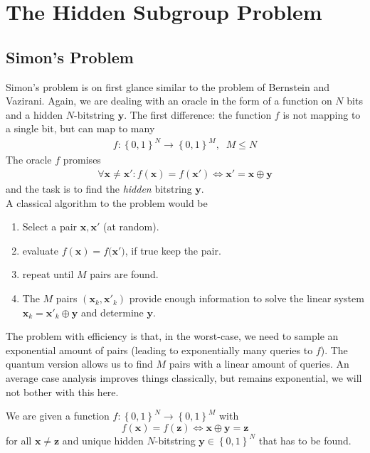 \section{The Hidden Subgroup Problem}

\subsection{Simon's Problem}
Simon's problem is on first glance similar to the problem of Bernstein and Vazirani. Again, we are dealing with an oracle in the form of a function on $N$ bits and a hidden $N$-bitstring $\mathbf{y}$. 
The first difference: the function $f$ is not mapping to a single bit, but can map to many
\begin{align}
    f: \left\{0,1\right\}^N \rightarrow \left\{0,1\right\}^M,\;\; M\leq N
\end{align}
The oracle $f$ promises
\begin{align}
    \forall \mathbf{x} \neq \mathbf{x}': f(\mathbf{x}) = f(\mathbf{x}') \Leftrightarrow \mathbf{x}' = \mathbf{x} \oplus \mathbf{y}
\end{align}
and the task is to find the \textit{hidden} bitstring $\mathbf{y}$.\\

A classical algorithm to the problem would be
\begin{enumerate}
    \item Select a pair $\mathbf{x},\mathbf{x'}$ (at random).
    \item evaluate $f(\mathbf{x})=f(\mathbf{x')}$, if true keep the pair.
    \item repeat until $M$ pairs are found.
    \item The $M$ pairs $\left(\mathbf{x}_k,\mathbf{x}'_k\right)$ provide enough information to solve the linear system $\mathbf{x}_k = \mathbf{x}'_k \oplus \mathbf{y}$ and determine $\mathbf{y}$.
\end{enumerate}
The problem with efficiency is that, in the worst-case, we need to sample an exponential amount of pairs (leading to exponentially many queries to $f$). The quantum version allows us to find $M$ pairs with a linear amount of queries. An average case analysis improves things classically, but remains exponential, we will not bother with this here.\\

\begin{def*}
We are given a function $f:\left\{0,1\right\}^N \rightarrow \left\{0,1\right\}^M$ with
$$ f(\mathbf{x}) = f(\mathbf{z}) \Leftrightarrow \mathbf{x} \oplus \mathbf{y} = \mathbf{z}$$
for all $\mathbf{x}\neq \mathbf{z}$ and unique hidden $N$-bitstring $\mathbf{y}\in\left\{0,1\right\}^N$ that has to be found.
\end{def*}

